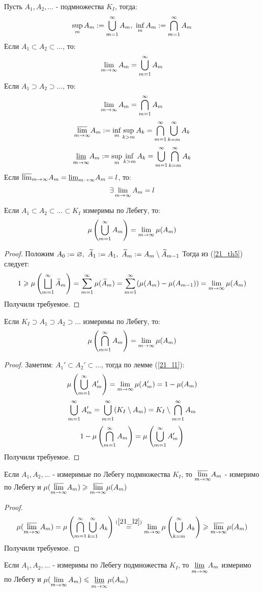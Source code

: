 \begin{definition}
	Пусть $A_1,A_2,\dots$ - подмножества $K_I$, тогда:
	\[\sup_mA_m:=\bc_{m=1}^\i A_m,\ \inf_mA_m:=\bigcap_{m=1}^\i A_m\]
	Если $A_1\subset A_2\subset\dots$, то:
	\[\lim_{m\ra\i}A_m=\bc_{m=1}^\i A_m\]
	Если $A_1\supset A_2\supset\dots$, то:
	\[\lim_{m\ra\i}A_m=\bigcap_{m=1}^\i A_m\]
	\[\underset{m\ra\i}{\v\lim}A_m:=\inf_m\sup_{k>m}A_k=\bigcap_{m=1}^\i\bc_{k=m}^\i A_k\]
	\[\underset{m\ra\i}{\uv\lim}A_m:=\sup_m\inf_{k>m}A_k=\bc_{m=1}^\i\bigcap_{k=m}^\i A_k\]
	Если $\ds\v\lim_{m\ra\i}A_m=\uv\lim_{m\ra\i}A_m=l$, то:
	\[\ex\lim_{m\ra\i}A_m=l\]
\end{definition}
\begin{lemma}\label{21_l1}
	Если $A_1\subset A_2\subset\dots\subset K_I$ измеримы по Лебегу, то:
	\[\mu\l(\bc_{m=1}^\i A_m\r)=\lim_{m\ra\i}\mu(A_m)\]
\end{lemma}
\begin{proof}
	Положим $A_0:=\emptyset,\ \t A_1:=A_1,\ \t A_m:=A_m\sm \t A_{m-1}$
	Тогда из (\ref{21_th5}) следует:
	\[1\ge\mu\l(\bsc_{m=1}^\i\t A_m\r)=\sum_{m=1}^\i\mu(\t A_m)=\sum_{m=1}^\i(\mu(A_m)-\mu(A_{m-1}))=\lim_{m\ra\i}\mu(A_m)\]
	Получили требуемое.
\end{proof}
\begin{lemma}\label{21_l2}
	Если $K_I\supset A_1\supset A_2\supset\dots$ измеримы по Лебегу, то:
	\[\mu\l(\bigcap_{m=1}^\i A_m\r)=\lim_{m\ra\i}\mu(A_m)\]
\end{lemma}
\begin{proof}
	Заметим: $A_1'\subset A_2'\subset\dots$, тогда по лемме (\ref{21_l1}):
	\[\mu\l(\bc_{m=1}^\i A_m'\r)=\lim_{m\ra\i}\mu(A_m')=1-\mu(A_m)\]
	\[\bigcup_{m=1}^\infty A_m'=\bigcup_{m=1}^\infty(K_I\setminus A_m)=K_I\setminus\bigcap_{m=1}^\infty A_m\]
	\[1-\mu\left(\bigcap_{m=1}^\infty A_m\right)=\mu\left(\bigcup_{m=1}^\infty A_m'\right)\]
	Получили требуемое.
\end{proof}
\begin{lemma}\label{21_l3}
	Если $A_1,A_2,\dots$ - измеримые по Лебегу подмножества $K_I$, то $\ds\us{m\ra\i}{\v\lim}A_m$ - измеримо по Лебегу и $\mu(\us{m\ra\i}{\v\lim}A_m)\ge\us{m\ra\i}{\v\lim}\mu(A_m)$
\end{lemma}
\begin{proof}
	\[\mu(\us{m\ra\i}{\v\lim}A_m)=\mu\l(\bigcap_{m=1}^\i\bc_{k=1}^\i A_k\r)\overset{(\ref{21_l2})}{=}\lim_{m\ra\i}\mu\l(\bc_{k=m}^\i A_k\r)\ge\us{m\ra\i}{\v\lim}\mu(A_m)\]
	Получили требуемое.
\end{proof}
\begin{lemma}\label{21_l4}
	Если $A_1,A_2,\dots$ - измеримы по Лебегу подмножества $K_I$, то $\us{m\ra\i}{\uv\lim}A_m$ измеримо по Лебегу и $\mu(\lim_{m\ra\i}A_m)\le\us{m\ra\i}{\uv\lim}\mu(A_m)$
\end{lemma}

